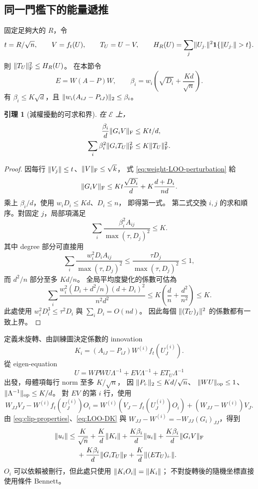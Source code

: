 \documentclass[11pt,a4paper]{article}
\theoremstyle{zhplain}
\newtheorem{lemma}[theorem]{引理}
\numberwithin{equation}{section}
\newcommand{\one}{\mathbf 1}
\newcommand{\op}{\mathrm{op}}
\newcommand{\Frob}{\mathrm{F}}
\newcommand{\cE}{\mathcal E}
\DeclarePairedDelimiter{\norm}{\lVert}{\rVert}
\begin{document}
\subsection{同一門檻下的能量遞推}
固定足夠大的 \(R\)，令
\[
 t=R/\sqrt n,\qquad
 V=f_t(U),\qquad T_U=U-V,\qquad
 H_R(U)=\sum_j\norm{U_{j\cdot}}^2\one\{\norm{U_{j\cdot}}>t\}.
\]
則 \(\norm{T_U}_{\Frob}^2\le H_R(U)\)。
在本節令
\[
 E=W(A-P)W,\qquad
 \beta_i=w_i\left(\sqrt{D_i}+\frac{Kd}{\sqrt n}\right).
\]
有 \(\beta_i\le K\sqrt d\)，且
\(\norm{w_i(A_{iJ}-P_{iJ})}_2\le\beta_i\)。

\begin{lemma}[減權擾動的可求和界]
\label{lem:weighted-tail}
在 \(\cE\) 上，
\begin{align}
 \frac{\beta_i}{d}\norm{G_iV}_{\Frob}&\le Kt/d,
 \label{eq:bounded-perturbation}\\
 \sum_i\beta_i^2\norm{G_iT_U}_{\Frob}^2
 &\le K\norm{T_U}_{\Frob}^2.
 \label{eq:summable-perturbation}
\end{align}
\end{lemma}
\begin{proof}
因每行 \(\norm{V_j}\le t\)、\(\norm V_{\Frob}\le\sqrt k\)，
式 \eqref{eq:weight-LOO-perturbation} 給
\[
 \norm{G_iV}_{\Frob}
 \le Kt\frac{\sqrt{D_i}}d
       +K\frac{d+D_i}{nd}.
\]
乘上 \(\beta_i/d\)，使用 \(w_iD_i\le Kd\)、\(D_i\le n\)，
即得第一式。
第二式交換 \(i,j\) 的求和順序。對固定 \(j\)，局部項滿足
\[
 \sum_i\frac{\beta_i^2A_{ij}}{\max(\tau,D_j)^2}\le K.
\]
其中 degree 部分可直接用
\[
 \sum_i\frac{w_i^2D_iA_{ij}}{\max(\tau,D_j)^2}
 \le\frac{\tau D_j}{\max(\tau,D_j)^2}\le1,
\]
而 \(d^2/n\) 部分至多 \(Kd/n\)。
全局平均度變化的係數可估為
\[
 \sum_i\frac{w_i^2(D_i+d^2/n)(d+D_i)^2}{n^2d^2}
 \le K\left(\frac dn+\frac{d^2}{n^2}\right)\le K.
\]
此處使用 \(w_i^2D_i^3\le\tau^2D_i\) 與 \(\sum_iD_i=O(nd)\)。
因此每個 \(\norm{(T_U)_j}^2\) 的係數都有一致上界。
\end{proof}

定義未旋轉、由訓練圖決定係數的 innovation
\begin{equation}
 K_i=(A_{iJ}-P_{iJ})W^{(i)}f_t(U_J^{(i)}).
 \label{eq:innovation}
\end{equation}
從 eigen-equation
\[
 U=WPWU\Lambda^{-1}+EV\Lambda^{-1}+ET_U\Lambda^{-1}
\]
出發，母體項每行 norm 至多 \(K/\sqrt n\)，
因 \(\norm{P_{i\cdot}}_2\le Kd/\sqrt n\)、
\(\norm{WU}_{\op}\le1\)、\(\norm{\Lambda^{-1}}_{\op}\le K/d\)。
對 \(EV\) 的第 \(i\) 行，使用
\[
 W_{JJ}V_J-W^{(i)}f_t(U_J^{(i)})O_i
 =W^{(i)}(V_J-f_t(U_J^{(i)})O_i)
 +(W_{JJ}-W^{(i)})V_J.
\]
由 \eqref{eq:clip-properties}、\eqref{eq:LOO-DK} 與
\(W_{JJ}-W^{(i)}=-W_{JJ}(G_i)_{JJ}\)，得到
\begin{align}
 \norm{u_i}\le {}&
 \frac K{\sqrt n}+\frac Kd\norm{K_i}
 +\frac{K\beta_i}{d}\norm{u_i}
 +\frac{K\beta_i}{d}\norm{G_iV}_{\Frob}\notag\\
 &+\frac{K\beta_i}{d}\norm{G_iT_U}_{\Frob}
 +\frac Kd\norm{(ET_U)_{i\cdot}}.
 \label{eq:row-inequality}
\end{align}
\(O_i\) 可以依賴被刪行，但此處只使用 \(\norm{K_iO_i}=\norm{K_i}\)；
不對旋轉後的隨機坐標直接使用條件 Bennett。
\end{document}
